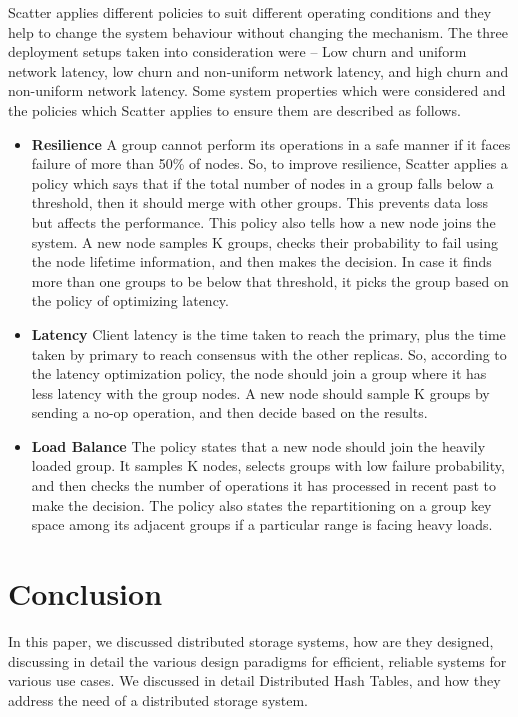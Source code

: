 \documentclass[11pt,a4paper]{article}
\begin{document}
    Scatter applies different policies to suit different operating conditions and they help to change the system behaviour without changing the mechanism. The three deployment setups taken into consideration were – Low churn and uniform network latency, low churn and non-uniform network latency, and high churn and non-uniform network latency. Some system properties which were considered and the policies which Scatter applies to ensure them are described as follows. 
    
    \begin{itemize}
        
        \item	\textbf{Resilience} A group cannot perform its operations in a safe manner if it faces failure of more than 50\% of nodes. So, to improve resilience, Scatter applies a policy which says that if the total number of nodes in a group falls below a threshold, then it should merge with other groups. This prevents data loss but affects the performance. This policy also tells how a new node joins the system. A new node samples K groups, checks their probability to fail using the node lifetime information, and then makes the decision. In case it finds more than one groups to be below that threshold, it picks the group based on the policy of optimizing latency.
        \item	\textbf{Latency} Client latency is the time taken to reach the primary, plus the time taken by primary to reach consensus with the other replicas. So, according to the latency optimization policy, the node should join a group where it has less latency with the group nodes. A new node should sample K groups by sending a no-op operation, and then decide based on the results.
        \item	\textbf{Load Balance} The policy states that a new node should join the heavily loaded group. It samples K nodes, selects groups with low failure probability, and then checks the number of operations it has processed in recent past to make the decision. The policy also states the repartitioning on a group key space among its adjacent groups if a particular range is facing heavy loads. 
        
    \end{itemize}
    
    \section{Conclusion}
    
    In this paper, we discussed distributed storage systems, how are they designed, discussing in detail the various design paradigms for efficient, reliable systems for various use cases. We discussed in detail Distributed Hash Tables, and how they address the need of a distributed storage system.
    
\end{document}

